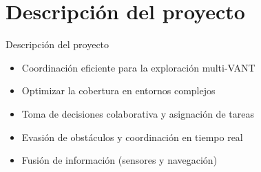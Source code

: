 \documentclass[
  24pt, %
  aspectratio=169, %
]{beamer}
\begin{document}
\section{Descripción del proyecto}
\begin{frame}{Descripción del proyecto}
  \begin{minipage}{0.47\textwidth}
    \begin{itemize}
    \item<1-> Coordinación eficiente para la exploración multi-VANT 
    \item<2-> Optimizar la cobertura en entornos complejos
    \item<3-> Toma de decisiones colaborativa y asignación de tareas
    \item<4-> Evasión de obstáculos y coordinación en tiempo real
    \item<5-> Fusión de información (sensores y navegación)
    \end{itemize}
  \end{minipage}
  \begin{minipage}{0.5\textwidth}
\end{minipage}
\end{frame}
\end{document}
